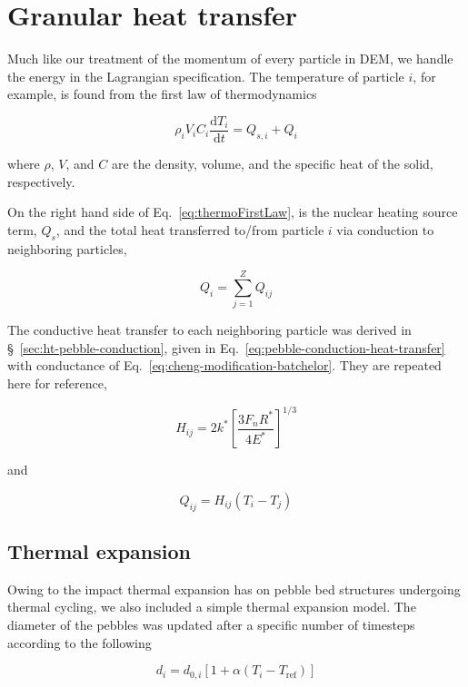 \section{Granular heat transfer}\label{sec:dem-heat-transfer}

Much like our treatment of the momentum of every particle in DEM, we handle the energy in the Lagrangian specification. The temperature of particle $i$, for example, is found from the first law of thermodynamics

\begin{equation}\label{eq:thermoFirstLaw}
	\rho_iV_iC_i\frac{\mathrm{d}T_i}{\mathrm{d}t} = Q_{s,i} + Q_{i}
\end{equation}

where $\rho$, $V$, and $C$ are the density, volume, and the specific heat of the solid, respectively. 

On the right hand side of Eq.~\ref{eq:thermoFirstLaw}, is the nuclear heating source term, $Q_{s}$, and the total heat transferred to/from particle $i$ via conduction to neighboring particles,

\begin{equation}
	Q_i = \sum_{j=1}^Z Q_{ij}
\end{equation}

The conductive heat transfer to each neighboring particle was derived in \S~\ref{sec:ht-pebble-conduction}, given in Eq.~\ref{eq:pebble-conduction-heat-transfer} with conductance of Eq.~\ref{eq:cheng-modification-batchelor}. They are repeated here for reference,

\begin{equation*}
	H_{ij}= 2k^*\left[\frac{3F_nR^*}{4E^*}\right]^{1/3}
\end{equation*}

and

\begin{equation*}
	Q_{ij} = H_{ij}(T_i - T_j)
\end{equation*} 


\subsection{Thermal expansion}
Owing to the impact thermal expansion has on pebble bed structures undergoing thermal cycling\cite{Tanigawa:2010cr, Vargas2007, Chen2009}, we also included a simple thermal expansion model.  The diameter of the pebbles was updated after a specific number of timesteps according to the following

\begin{equation}
	d_i = d_{0,i}\left[1+\alpha\left(T_i - T_\text{ref}\right)\right]
\end{equation}

